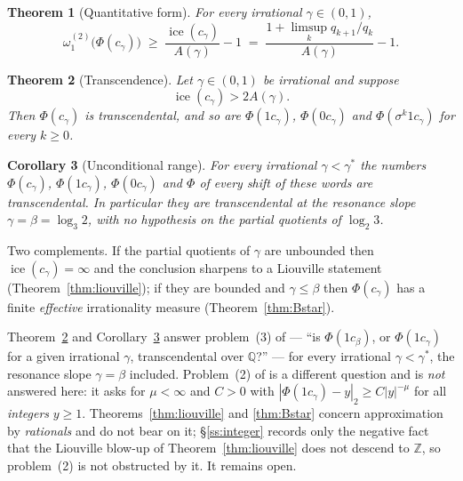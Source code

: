 \documentclass[11pt,reqno]{amsart}
\theoremstyle{plain}
\newtheorem{theorem}{Theorem}[section]
\newtheorem{corollary}[theorem]{Corollary}
\theoremstyle{definition}
\DeclareMathOperator{\ice}{ice}
\newcommand{\Z}{\mathbb{Z}}
\newcommand{\Q}{\mathbb{Q}}
\newcommand{\PH}{\Phi}
\newcommand{\gs}{\gamma^{*}}
\newcommand{\Av}{A(\gamma)}
\newcommand{\om}{\omega_1^{(2)}}
\begin{document}
\begin{theorem}[Quantitative form]\label{thm:quant}
For every irrational $\gamma\in(0,1)$,
\[
  \om\bigl(\PH(c_\gamma)\bigr)\;\ge\;\frac{\ice(c_\gamma)}{\Av}-1
  \;=\;\frac{1+\limsup_{k}q_{k+1}/q_k}{\Av}-1 .
\]
\end{theorem}

\begin{theorem}[Transcendence]\label{thm:main}
Let $\gamma\in(0,1)$ be irrational and suppose
\begin{equation}\label{eq:T}
  \ice(c_\gamma)>2\Av . \tag{T}
\end{equation}
Then $\PH(c_\gamma)$ is transcendental, and so are $\PH(1c_\gamma)$, $\PH(0c_\gamma)$ and
$\PH(\sigma^k 1c_\gamma)$ for every $k\ge0$.
\end{theorem}

\begin{corollary}[Unconditional range]\label{cor:uncond}
For every irrational $\gamma<\gs$ the numbers $\PH(c_\gamma)$, $\PH(1c_\gamma)$, $\PH(0c_\gamma)$
and $\PH$ of every shift of these words are transcendental. In particular they are transcendental at
the resonance slope $\gamma=\beta=\log_3 2$, \emph{with no hypothesis on the partial quotients of
$\log_2 3$}.
\end{corollary}

Two complements. If the partial quotients of $\gamma$ are unbounded then $\ice(c_\gamma)=\infty$ and
the conclusion sharpens to a Liouville statement (Theorem~\ref{thm:liouville}); if they are bounded
and $\gamma\le\beta$ then $\PH(c_\gamma)$ has a finite \emph{effective} irrationality measure
(Theorem~\ref{thm:Bstar}).

Theorem~\ref{thm:main} and Corollary~\ref{cor:uncond} answer problem~(3) of \cite[\S12]{DJirr}
--- ``is $\PH(1c_\beta)$, or $\PH(1c_\gamma)$ for a given irrational $\gamma$, transcendental
over $\Q$?'' --- for every irrational $\gamma<\gs$, the resonance slope $\gamma=\beta$ included.
Problem~(2) of \cite[\S12]{DJirr} is a different question and is \emph{not} answered here: it asks
for $\mu<\infty$ and $C>0$ with $|\PH(1c_\gamma)-y|_2\ge C|y|^{-\mu}$ for all \emph{integers}
$y\ge1$. Theorems~\ref{thm:liouville} and \ref{thm:Bstar} concern approximation by
\emph{rationals} and do not bear on it; \S\ref{ss:integer} records only the negative fact that the
Liouville blow-up of Theorem~\ref{thm:liouville} does not descend to $\Z$, so problem~(2) is not
obstructed by it. It remains open.
\end{document}
